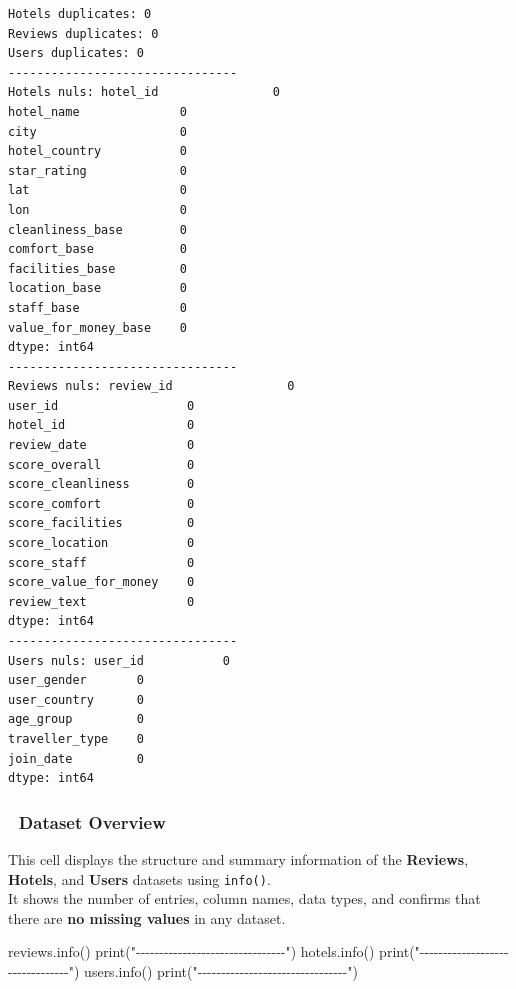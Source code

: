 \documentclass[
  letterpaper,
  DIV=11,
  numbers=noendperiod]{scrartcl}
\newenvironment{Shaded}{\begin{snugshade}}{\end{snugshade}}
\newcommand{\BuiltInTok}[1]{\textcolor[rgb]{0.00,0.23,0.31}{#1}}
\newcommand{\NormalTok}[1]{\textcolor[rgb]{0.00,0.23,0.31}{#1}}
\newcommand{\StringTok}[1]{\textcolor[rgb]{0.13,0.47,0.30}{#1}}
\begin{document}
\begin{verbatim}
Hotels duplicates: 0
Reviews duplicates: 0
Users duplicates: 0
--------------------------------
Hotels nuls: hotel_id                0
hotel_name              0
city                    0
hotel_country           0
star_rating             0
lat                     0
lon                     0
cleanliness_base        0
comfort_base            0
facilities_base         0
location_base           0
staff_base              0
value_for_money_base    0
dtype: int64
--------------------------------
Reviews nuls: review_id                0
user_id                  0
hotel_id                 0
review_date              0
score_overall            0
score_cleanliness        0
score_comfort            0
score_facilities         0
score_location           0
score_staff              0
score_value_for_money    0
review_text              0
dtype: int64
--------------------------------
Users nuls: user_id           0
user_gender       0
user_country      0
age_group         0
traveller_type    0
join_date         0
dtype: int64
\end{verbatim}

\subsubsection{🧾 Dataset Overview}\label{dataset-overview}

This cell displays the structure and summary information of the
\textbf{Reviews}, \textbf{Hotels}, and \textbf{Users} datasets using
\texttt{info()}.\\
It shows the number of entries, column names, data types, and confirms
that there are \textbf{no missing values} in any dataset.

\begin{Shaded}
\begin{Highlighting}[]
\NormalTok{reviews.info()}
\BuiltInTok{print}\NormalTok{(}\StringTok{"{-}{-}{-}{-}{-}{-}{-}{-}{-}{-}{-}{-}{-}{-}{-}{-}{-}{-}{-}{-}{-}{-}{-}{-}{-}{-}{-}{-}{-}{-}{-}{-}"}\NormalTok{)   }
\NormalTok{hotels.info()}
\BuiltInTok{print}\NormalTok{(}\StringTok{"{-}{-}{-}{-}{-}{-}{-}{-}{-}{-}{-}{-}{-}{-}{-}{-}{-}{-}{-}{-}{-}{-}{-}{-}{-}{-}{-}{-}{-}{-}{-}{-}"}\NormalTok{)}
\NormalTok{users.info()}
\BuiltInTok{print}\NormalTok{(}\StringTok{"{-}{-}{-}{-}{-}{-}{-}{-}{-}{-}{-}{-}{-}{-}{-}{-}{-}{-}{-}{-}{-}{-}{-}{-}{-}{-}{-}{-}{-}{-}{-}{-}"}\NormalTok{)}
\end{Highlighting}
\end{Shaded}
\end{document}
